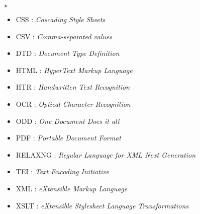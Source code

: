 \begin{center}
$\star$
\end{center} 

\begin{itemize}
    
    \item CSS : \emph{Cascading Style Sheets}
    \item CSV : \emph{Comma-separated values}
    \item DTD : \emph{Document Type Definition}
    \item HTML : \emph{HyperText Markup Language}
    \item HTR : \emph{Handwritten Text Recognition}
    \item OCR : \emph{Optical Character Recognition}
    \item ODD : \emph{One Document Does it all}
    \item PDF : \emph{Portable Document Format}
    \item RELAXNG : \emph{Regular Language for XML Next Generation}
    \item TEI : \emph{Text Encoding Initiative}
    \item XML : \emph{eXtensible Markup Language}
    \item XSLT : \emph{eXtensible Stylesheet Language Transformations}
\end{itemize}